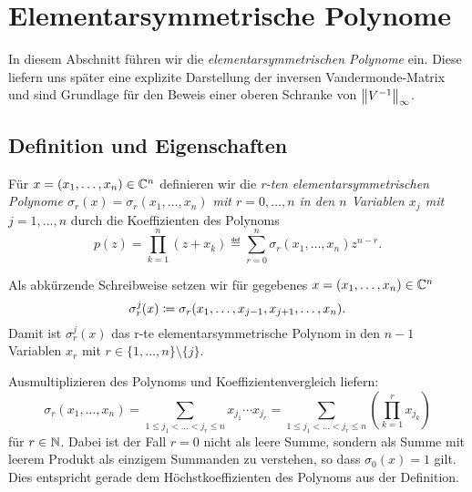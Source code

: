\chapter{Elementarsymmetrische Polynome}

In diesem Abschnitt führen wir die \emph{elementarsymmetrischen Polynome} ein.
Diese liefern uns später eine explizite Darstellung der inversen
Vandermonde-Matrix und sind Grundlage für den Beweis einer oberen Schranke von
$\left\lVert V^{-1} \right\rVert_\infty$.

\section{Definition und Eigenschaften}

\begin{mydef}
    Für $x = (x_1, \dots, x_{n}) \in \mathbb{C}^n$ definieren wir die
    \emph{r-ten elementarsymmetrischen Polynome
    $\sigma_{r}(x) = \sigma_{r}(x_1, \dots, x_{n})$ mit $r = 0, \dots, n$
    in den $n$ Variablen $x_j$ mit $j = 1, \dots, n$} durch die Koeffizienten
    des Polynoms
    \[
        p(z)
        = \prod_{k=1}^{n} (z + x_k)
        \eqdef \sum_{r=0}^{n} \sigma_{r}(x_1, \dots, x_{n}) z^{n-r}.
    \]
\end{mydef}

\begin{notation}
    Als abkürzende Schreibweise setzen wir für gegebenes
    $x = (x_1, \dots, x_{n}) \in \mathbb{C}^n$
    \[
        \sigma_{r}^{j}(x) \coloneqq \sigma_{r}(x_1, \dots, x_{j-1}, x_{j+1}, \dots, x_{n}).
    \]
    Damit ist $\sigma_{r}^{j}(x)$ das r-te elementarsymmetrische Polynom in den
    $n-1$ Variablen $x_r$ mit $r \in \{ 1, \dots, n \} \setminus \{ j \}$.
\end{notation}

\begin{remark}
    Ausmultiplizieren des Polynoms und Koeffizientenvergleich liefern:
    \begin{equation}
        \label{eq:explicit_elementary_symmetric_polynomials}
        \sigma_{r}(x_1, \dots, x_{n})
        = \sum_{1 \leq j_1 < \dots < j_r \leq n} x_{j_1} \cdots x_{j_r}
        = \sum_{1 \leq j_1 < \dots < j_r \leq n} \left( \prod_{k=1}^r x_{j_k} \right)
    \end{equation}
    für $r \in \mathbb{N}$.
    Dabei ist der Fall $r = 0$ nicht als leere Summe, sondern als Summe mit
    leerem Produkt als einzigem Summanden zu verstehen, so dass
    $\sigma_0(x) = 1$ gilt. Dies entspricht gerade dem Höchstkoeffizienten des
    Polynoms aus der Definition.
\end{remark}

